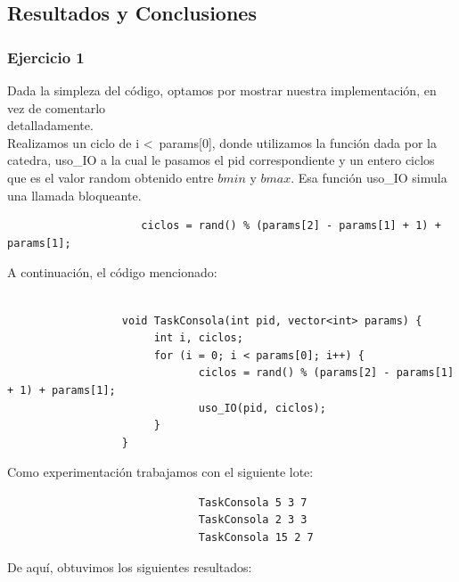 \subsection{Resultados y Conclusiones}

\subsubsection[Resolución Ejercicio 1]{Ejercicio 1}

\indent Dada la simpleza del código, optamos por mostrar nuestra implementación, en vez de comentarlo\\ detalladamente.\\
\indent Realizamos un ciclo de i \textless \ params[0], donde utilizamos la función dada por la catedra, uso\_IO a la cual le pasamos
el pid correspondiente y un entero ciclos que es el valor random obtenido entre $bmin$ y $bmax$. Esa función uso\_IO simula una llamada bloqueante.
\begin{center}
 \begin{verbatim}
                     ciclos = rand() % (params[2] - params[1] + 1) + params[1];
 \end{verbatim}

\end{center}

\indent A continuaci\'{o}n, el c\'{o}digo mencionado:

\begin{verbatim}

                  void TaskConsola(int pid, vector<int> params) {
                       int i, ciclos;              
                       for (i = 0; i < params[0]; i++) {
                              ciclos = rand() % (params[2] - params[1] + 1) + params[1];  
                              uso_IO(pid, ciclos);
                       }
                  } 

\end{verbatim}

\indent Como experimentaci\'{o}n trabajamos con el siguiente lote:\\

\begin{verbatim}
                              TaskConsola 5 3 7
                              TaskConsola 2 3 3
                              TaskConsola 15 2 7
\end{verbatim}

De aqu\'{i}, obtuvimos los siguientes resultados:\\

